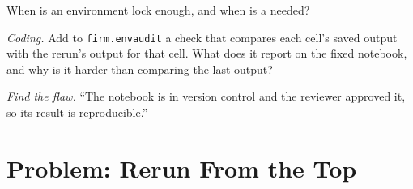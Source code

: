 \begin{exercise}[$\star\star$]\label{exo:pl:the-research-environment:6}
When is an environment lock enough, and when is a  needed?
\end{exercise}

\begin{exercise}[$\star\star\star$]\label{exo:pl:the-research-environment:7}
\emph{Coding.} Add to \texttt{firm.envaudit} a check that compares each cell's saved output with the rerun's output for that cell. What does
it report on the fixed notebook, and why is it harder than comparing the last output?
\end{exercise}

\begin{exercise}[$\star\star\star$]\label{exo:pl:the-research-environment:8}
\emph{Find the flaw.} ``The notebook is in version control and the reviewer approved it, so its result is reproducible.''
\end{exercise}

\section{Problem: Rerun From the Top}

